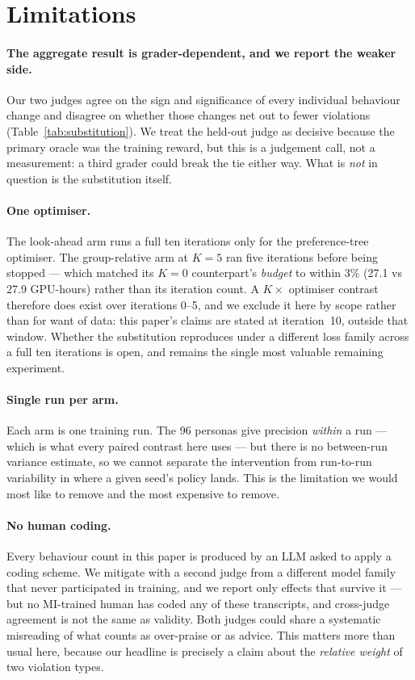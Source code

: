 \section*{Limitations}
\label{sec:limitations}

\paragraph{The aggregate result is grader-dependent, and we report the weaker side.} Our two judges
agree on the sign and significance of every individual behaviour change and disagree on whether
those changes net out to fewer violations (Table~\ref{tab:substitution}). We treat the held-out
judge as decisive because the primary oracle was the training reward, but this is a judgement call,
not a measurement: a third grader could break the tie either way. What is \emph{not} in question is
the substitution itself.

\paragraph{One optimiser.} The look-ahead arm runs a full ten iterations only for the
preference-tree optimiser. The group-relative arm at $K{=}5$ ran five iterations before being
stopped --- which matched its $K{=}0$ counterpart's \emph{budget} to within 3\% (27.1 vs 27.9
GPU-hours) rather than its iteration count. A $K \times$ optimiser contrast therefore does exist
over iterations 0--5, and we exclude it here by scope rather than for want of data: this paper's
claims are stated at iteration~10, outside that window. Whether the substitution reproduces under
a different loss family across a full ten iterations is open, and remains the single most valuable
remaining experiment.

\paragraph{Single run per arm.} Each arm is one training run. The 96 personas give precision
\emph{within} a run --- which is what every paired contrast here uses --- but there is no
between-run variance estimate, so we cannot separate the intervention from run-to-run variability
in where a given seed's policy lands. This is the limitation we would most like to remove and the
most expensive to remove.

\paragraph{No human coding.} Every behaviour count in this paper is produced by an LLM asked to
apply a coding scheme. We mitigate with a second judge from a different model family that never
participated in training, and we report only effects that survive it --- but no MI-trained human
has coded any of these transcripts, and cross-judge agreement is not the same as validity. Both
judges could share a systematic misreading of what counts as over-praise or as advice. This
matters more than usual here, because our headline is precisely a claim about the \emph{relative
weight} of two violation types.

